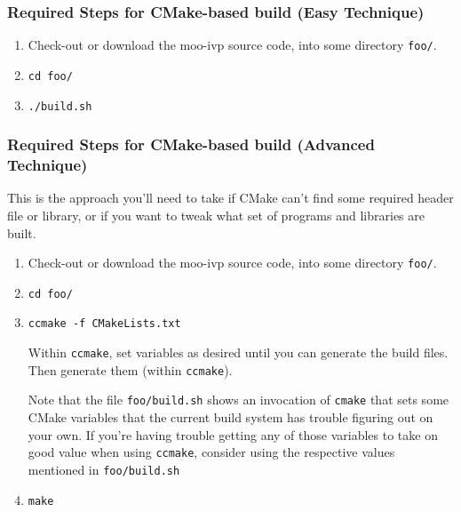 \documentclass[letterpaper,10pt]{article}
\begin{document}
\subsubsection{Required Steps for CMake-based build (Easy Technique)}
\begin{enumerate}
 \item Check-out or download the moo-ivp source code, into some directory \verb|foo/|.
 \item \verb|cd foo/|
 \item \verb|./build.sh|
\end{enumerate}

\subsubsection{Required Steps for CMake-based build (Advanced Technique)}
This is the approach you'll need to take if CMake can't find some required header
file or library, or if you want to tweak what set of programs and libraries are
built.

\begin{enumerate}
 \item Check-out or download the moo-ivp source code, into some directory \verb|foo/|.
 \item \verb|cd foo/|
 \item \verb|ccmake -f CMakeLists.txt|

	Within \verb|ccmake|, set variables as desired until you can generate the
	build files.  Then generate them (within \verb|ccmake|).

	Note that the file \verb|foo/build.sh| shows an invocation of \verb|cmake| that
	sets some CMake variables that the current build system has trouble figuring
	out on your own.  If you're having trouble getting any of those variables to
	take on good value when using \verb|ccmake|, consider using the respective
	values mentioned in \verb|foo/build.sh|

\item \verb|make|

\end{enumerate}
\end{document}
